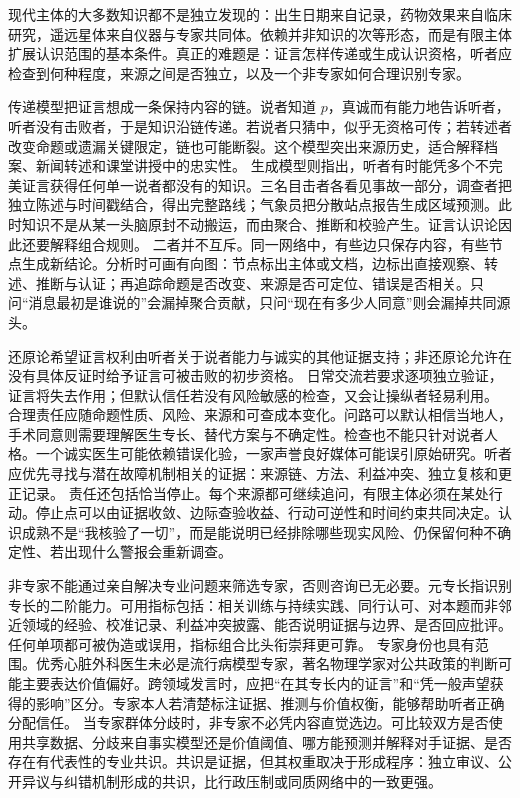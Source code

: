 现代主体的大多数知识都不是独立发现的：出生日期来自记录，药物效果来自临床研究，遥远星体来自仪器与专家共同体。依赖并非知识的次等形态，而是有限主体扩展认识范围的基本条件。真正的难题是：证言怎样传递或生成认识资格，听者应检查到何种程度，来源之间是否独立，以及一个非专家如何合理识别专家。

传递模型把证言想成一条保持内容的链。说者知道 \(p\)，真诚而有能力地告诉听者，听者没有击败者，于是知识沿链传递。若说者只猜中，似乎无资格可传；若转述者改变命题或遗漏关键限定，链也可能断裂。这个模型突出来源历史，适合解释档案、新闻转述和课堂讲授中的忠实性。 生成模型则指出，听者有时能凭多个不完美证言获得任何单一说者都没有的知识。三名目击者各看见事故一部分，调查者把独立陈述与时间戳结合，得出完整路线；气象员把分散站点报告生成区域预测。此时知识不是从某一头脑原封不动搬运，而由聚合、推断和校验产生。证言认识论因此还要解释组合规则。 二者并不互斥。同一网络中，有些边只保存内容，有些节点生成新结论。分析时可画有向图：节点标出主体或文档，边标出直接观察、转述、推断与认证；再追踪命题是否改变、来源是否可定位、错误是否相关。只问“消息最初是谁说的”会漏掉聚合贡献，只问“现在有多少人同意”则会漏掉共同源头。

还原论希望证言权利由听者关于说者能力与诚实的其他证据支持；非还原论允许在没有具体反证时给予证言可被击败的初步资格。\parencite{lackey2008} 日常交流若要求逐项独立验证，证言将失去作用；但默认信任若没有风险敏感的检查，又会让操纵者轻易利用。 合理责任应随命题性质、风险、来源和可查成本变化。问路可以默认相信当地人，手术同意则需要理解医生专长、替代方案与不确定性。检查也不能只针对说者人格。一个诚实医生可能依赖错误化验，一家声誉良好媒体可能误引原始研究。听者应优先寻找与潜在故障机制相关的证据：来源链、方法、利益冲突、独立复核和更正记录。 责任还包括恰当停止。每个来源都可继续追问，有限主体必须在某处行动。停止点可以由证据收敛、边际查验收益、行动可逆性和时间约束共同决定。认识成熟不是“我核验了一切”，而是能说明已经排除哪些现实风险、仍保留何种不确定性、若出现什么警报会重新调查。

非专家不能通过亲自解决专业问题来筛选专家，否则咨询已无必要。元专长指识别专长的二阶能力。可用指标包括：相关训练与持续实践、同行认可、对本题而非邻近领域的经验、校准记录、利益冲突披露、能否说明证据与边界、是否回应批评。任何单项都可被伪造或误用，指标组合比头衔崇拜更可靠。 专家身份也具有范围。优秀心脏外科医生未必是流行病模型专家，著名物理学家对公共政策的判断可能主要表达价值偏好。跨领域发言时，应把“在其专长内的证言”和“凭一般声望获得的影响”区分。专家本人若清楚标注证据、推测与价值权衡，能够帮助听者正确分配信任。 当专家群体分歧时，非专家不必凭内容直觉选边。可比较双方是否使用共享数据、分歧来自事实模型还是价值阈值、哪方能预测并解释对手证据、是否存在有代表性的专业共识。共识是证据，但其权重取决于形成程序：独立审议、公开异议与纠错机制形成的共识，比行政压制或同质网络中的一致更强。


